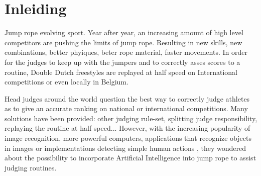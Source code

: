 
\section{Inleiding}%
\label{sec:inleiding}

    

Jump rope evolving sport.
Year after year, an increasing amount of high level competitors are pushing the limits of jump rope.
Resulting in new skills, new combinations, better phyiques, beter rope material, faster movements.
In order for the judges to keep up with the jumpers and to correctly asses scores to a routine, Double Dutch freestyles are replayed at half speed on International competitions or even locally in Belgium.

Head judges around the world question the best way to correctly judge athletes as to give an accurate ranking on national or international competitions.
Many solutions have been provided: other judging rule-set, splitting judge responsibility, replaying the routine at half speed...
However, with the increasing popularity of image recognition, more powerful computers, applications that recognize objects in images \autocite{Singh_Gill_2022} or implementations detecting simple human actions \autocite{LUQMAN_2022}, they wondered about the possibility to incorporate Artificial Intelligence into jump rope to assist judging routines.

